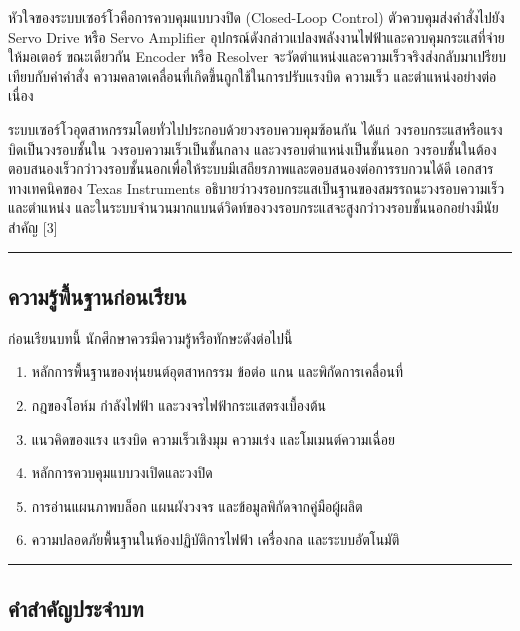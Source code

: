 หัวใจของระบบเซอร์โวคือการควบคุมแบบวงปิด (Closed-Loop Control) ตัวควบคุมส่งคำสั่งไปยัง Servo Drive หรือ Servo Amplifier อุปกรณ์ดังกล่าวแปลงพลังงานไฟฟ้าและควบคุมกระแสที่จ่ายให้มอเตอร์ ขณะเดียวกัน Encoder หรือ Resolver จะวัดตำแหน่งและความเร็วจริงส่งกลับมาเปรียบเทียบกับค่าคำสั่ง ความคลาดเคลื่อนที่เกิดขึ้นถูกใช้ในการปรับแรงบิด ความเร็ว และตำแหน่งอย่างต่อเนื่อง

ระบบเซอร์โวอุตสาหกรรมโดยทั่วไปประกอบด้วยวงรอบควบคุมซ้อนกัน ได้แก่ วงรอบกระแสหรือแรงบิดเป็นวงรอบชั้นใน วงรอบความเร็วเป็นชั้นกลาง และวงรอบตำแหน่งเป็นชั้นนอก วงรอบชั้นในต้องตอบสนองเร็วกว่าวงรอบชั้นนอกเพื่อให้ระบบมีเสถียรภาพและตอบสนองต่อการรบกวนได้ดี เอกสารทางเทคนิคของ Texas Instruments อธิบายว่าวงรอบกระแสเป็นฐานของสมรรถนะวงรอบความเร็วและตำแหน่ง และในระบบจำนวนมากแบนด์วิดท์ของวงรอบกระแสจะสูงกว่าวงรอบชั้นนอกอย่างมีนัยสำคัญ [3]

\par\noindent\rule{\textwidth}{0.4pt}\par

\subsection{ความรู้พื้นฐานก่อนเรียน}

ก่อนเรียนบทนี้ นักศึกษาควรมีความรู้หรือทักษะดังต่อไปนี้

\begin{enumerate}
    \item หลักการพื้นฐานของหุ่นยนต์อุตสาหกรรม ข้อต่อ แกน และพิกัดการเคลื่อนที่
    \item กฎของโอห์ม กำลังไฟฟ้า และวงจรไฟฟ้ากระแสตรงเบื้องต้น
    \item แนวคิดของแรง แรงบิด ความเร็วเชิงมุม ความเร่ง และโมเมนต์ความเฉื่อย
    \item หลักการควบคุมแบบวงเปิดและวงปิด
    \item การอ่านแผนภาพบล็อก แผนผังวงจร และข้อมูลพิกัดจากคู่มือผู้ผลิต
    \item ความปลอดภัยพื้นฐานในห้องปฏิบัติการไฟฟ้า เครื่องกล และระบบอัตโนมัติ
\end{enumerate}

\par\noindent\rule{\textwidth}{0.4pt}\par

\subsection{คำสำคัญประจำบท}

